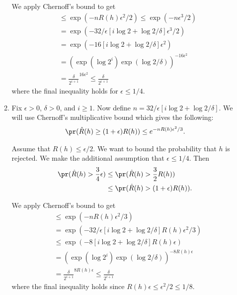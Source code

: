 \begin{enumerate}
\begin{enumerate}
        We apply Chernoff's bound to get
        \begin{align}
            &\leq \exp(-n R(h) \epsilon^2/2)
            \leq \exp(-n \epsilon^3/2)
            \nonumber \\
            &= \exp(-32/\epsilon [i \log 2 + \log 2/\delta] \epsilon^3/2)
            \nonumber \\
            &=  \exp(-16 [i \log 2 + \log 2/\delta] \epsilon^2)
            \nonumber \\
            &= \left(\exp(\log 2^i) \exp(\log 2/\delta)
            \right)^{-16\epsilon^2}
            \nonumber \\
            &= \frac{\delta}{2^{i+1}}^{16\epsilon^2}
            \leq \frac{\delta}{2^{i+1}} 
            \nonumber
        \end{align}
        where the final inequality holds for
        $\epsilon \leq 1/4$.
        
        \item Fix $\epsilon > 0$, $\delta > 0$, and $i \geq 1$.
        Now define $n=32/\epsilon [i \log 2 + \log 2/\delta]$.
        We will use Chernoff's multiplicative bound
        which gives the following:
        \begin{align}
            \pr(\hat{R}(h)\geq(1+\epsilon)R(h)) \leq
            e^{-nR(h)\epsilon^2/3}.
            \nonumber
        \end{align}

        Assume that $R(h) \leq \epsilon/2$.
        We want to bound the probability that
        $h$ is rejected.
        We make the additional assumption
        that $\epsilon \leq 1/4$.
        Then
        \begin{align}
            \pr(\hat{R}(h)> \frac{3}{4}\epsilon)
            &\leq \pr(\hat{R}(h)>\frac{3}{2}R(h))
            \nonumber \\
            &\leq \pr(\hat{R}(h)> (1+\epsilon)R(h)).
            \nonumber
        \end{align}

        We apply Chernoff's bound to get
        \begin{align}
            &\leq \exp(-n R(h) \epsilon^2/3)
            \nonumber \\
            &= \exp(-32/\epsilon [i \log 2 + \log 2/\delta] R(h)\epsilon^2/3)
            \nonumber \\
            &\leq \exp(-8 [i \log 2 + \log 2/\delta] R(h) \epsilon)
            \nonumber \\
            &= \left(\exp(\log 2^i) \exp(\log 2/\delta)
            \right)^{-8R(h)\epsilon}
            \nonumber \\
            &= \frac{\delta}{2^{i+1}}^{8R(h)\epsilon}
            \leq \frac{\delta}{2^{i+1}} 
            \nonumber
        \end{align}
        where the final inequality holds since
        $R(h)\epsilon \leq \epsilon^2/2 \leq 1/8$.


\end{enumerate}
\end{enumerate}
